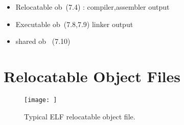 \begin{itemize}
    \item Relocatable ob~(7.4) : compiler,assembler output
    \item Executable ob~(7.8,7.9) linker output
    \item shared ob~ (7.10)
\end{itemize}



\section{Relocatable Object Files}


\begin{figure}[h!]
    \centering
    \texttt{[image: ]}
    \caption{Typical ELF relocatable object file.}
\end{figure}

